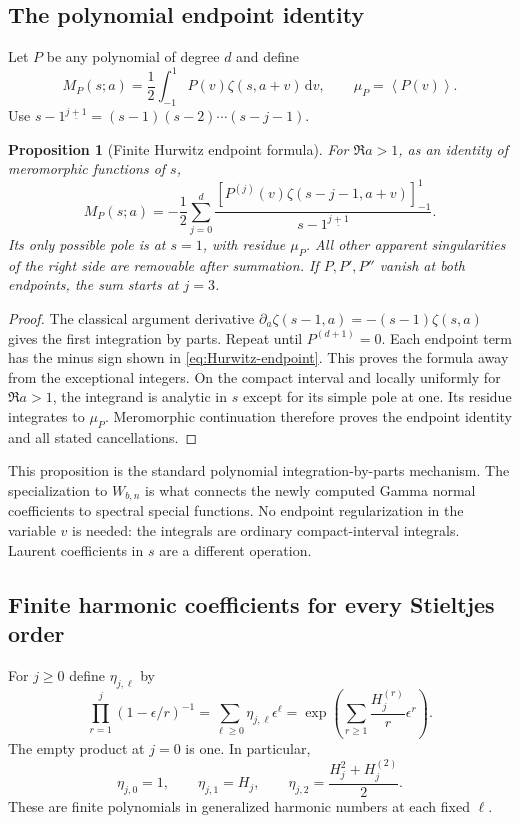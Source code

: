 \documentclass[11pt]{article}
\numberwithin{equation}{section}
\newtheorem{proposition}[theorem]{Proposition}
\theoremstyle{definition}\newtheorem{definition}[theorem]{Definition}
\theoremstyle{remark}\newtheorem{remark}[theorem]{Remark}
\newcommand{\avg}[1]{\left\langle #1\right\rangle}
\newcommand{\dd}{\,\mathrm d}
\newcommand{\fall}[2]{#1^{\underline{#2}}}
\newcommand{\eval}[1]{\left[#1\right]_{-1}^{1}}
\begin{document}
\subsection{The polynomial endpoint identity}
Let $P$ be any polynomial of degree $d$ and define
\[
 M_P(s;a)=\frac12\int_{-1}^1P(v)\zeta(s,a+v)\dd v,
 \qquad \mu_P=\avg{P(v)}.
\]
Use $\fall{s-1}{j+1}=(s-1)(s-2)\cdots(s-j-1)$.

\begin{proposition}[Finite Hurwitz endpoint formula]\label{prop:Hurwitz}
For $\Re a>1$, as an identity of meromorphic functions of $s$,
\begin{equation}\label{eq:Hurwitz-endpoint}
 M_P(s;a)=-\frac12\sum_{j=0}^d
 \frac{\eval{P^{(j)}(v)\zeta(s-j-1,a+v)}}{\fall{s-1}{j+1}}.
\end{equation}
Its only possible pole is at $s=1$, with residue $\mu_P$.
All other apparent singularities of the right side are removable after
summation. If $P,P',P''$ vanish at both endpoints, the sum starts at
$j=3$.
\end{proposition}
\begin{proof}
The classical argument derivative
$\partial_a\zeta(s-1,a)=-(s-1)\zeta(s,a)$
\cite{DLMF25} gives the first integration by parts. Repeat until
$P^{(d+1)}=0$. Each endpoint term has the minus sign shown in
\eqref{eq:Hurwitz-endpoint}. This proves the formula away from the
exceptional integers. On the compact interval and locally uniformly for
$\Re a>1$, the integrand is analytic in $s$ except for its simple
pole at one. Its residue integrates to $\mu_P$. Meromorphic continuation
therefore proves the endpoint identity and all stated cancellations.
\end{proof}

This proposition is the standard polynomial integration-by-parts
mechanism. The specialization to $W_{b,n}$ is what connects the newly
computed Gamma normal coefficients to spectral special functions.
No endpoint regularization in the variable $v$ is needed: the integrals
are ordinary compact-interval integrals. Laurent coefficients in $s$
are a different operation.

\subsection{Finite harmonic coefficients for every Stieltjes order}
For $j\ge0$ define $\eta_{j,\ell}$ by
\begin{equation}\label{eq:eta}
 \prod_{r=1}^j(1-\epsilon/r)^{-1}
 =\sum_{\ell\ge0}\eta_{j,\ell}\epsilon^\ell
 =\exp\left(\sum_{r\ge1}\frac{H_j^{(r)}}r\epsilon^r\right).
\end{equation}
The empty product at $j=0$ is one. In particular,
\[
 \eta_{j,0}=1,\qquad \eta_{j,1}=H_j,\qquad
 \eta_{j,2}=\frac{H_j^2+H_j^{(2)}}2.
\]
These are finite polynomials in generalized harmonic numbers at each
fixed $\ell$.
\end{document}
